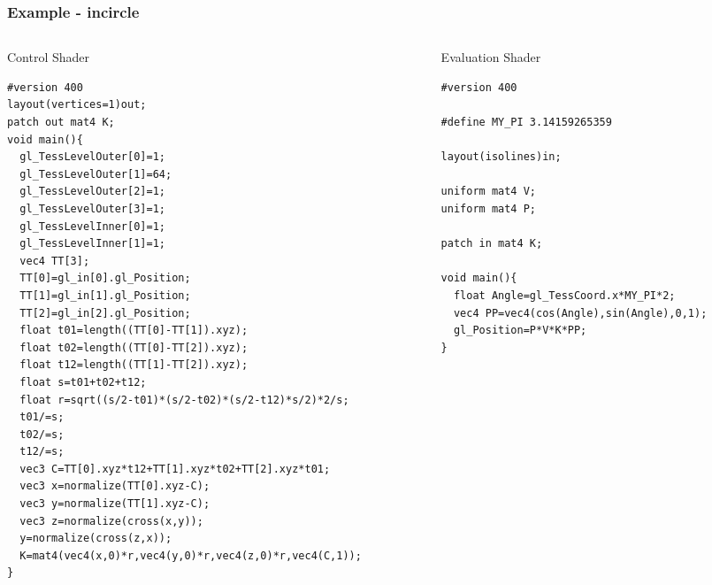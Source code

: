 \begin{frame}[fragile]
    \frametitle{Example - incircle}
  \begin{columns}[T]
    \begin{column}{.44\textwidth}
      Control Shader
  	{\tiny
\begin{verbatim}
#version 400
layout(vertices=1)out;
patch out mat4 K;
void main(){
  gl_TessLevelOuter[0]=1;
  gl_TessLevelOuter[1]=64;
  gl_TessLevelOuter[2]=1;
  gl_TessLevelOuter[3]=1;
  gl_TessLevelInner[0]=1;
  gl_TessLevelInner[1]=1;
  vec4 TT[3];
  TT[0]=gl_in[0].gl_Position;
  TT[1]=gl_in[1].gl_Position;
  TT[2]=gl_in[2].gl_Position;
  float t01=length((TT[0]-TT[1]).xyz);
  float t02=length((TT[0]-TT[2]).xyz);
  float t12=length((TT[1]-TT[2]).xyz);
  float s=t01+t02+t12;
  float r=sqrt((s/2-t01)*(s/2-t02)*(s/2-t12)*s/2)*2/s;
  t01/=s;
  t02/=s;
  t12/=s;
  vec3 C=TT[0].xyz*t12+TT[1].xyz*t02+TT[2].xyz*t01;
  vec3 x=normalize(TT[0].xyz-C);
  vec3 y=normalize(TT[1].xyz-C);
  vec3 z=normalize(cross(x,y));
  y=normalize(cross(z,x));
  K=mat4(vec4(x,0)*r,vec4(y,0)*r,vec4(z,0)*r,vec4(C,1));
}
  	\end{verbatim}
		}
    \end{column}
    \begin{column}{.48\textwidth}
      Evaluation Shader
  	{\tiny
\begin{verbatim}
#version 400

#define MY_PI 3.14159265359

layout(isolines)in;

uniform mat4 V;
uniform mat4 P;

patch in mat4 K;

void main(){
  float Angle=gl_TessCoord.x*MY_PI*2;
  vec4 PP=vec4(cos(Angle),sin(Angle),0,1);
  gl_Position=P*V*K*PP;
}
  	\end{verbatim}
		}
    \end{column}
  \end{columns}

\end{frame}


